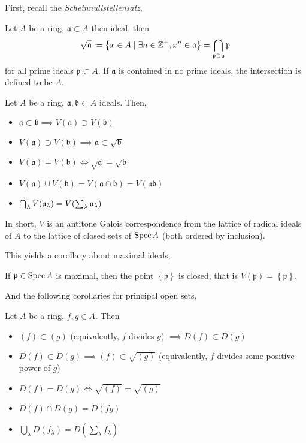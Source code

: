 \documentclass[000-main.tex]{subfiles}
\begin{document}
First, recall the \emph{Scheinnullstellensatz},
\begin{theorem}
  Let $A$ be a ring, $\mathfrak{a}\subset A$ then ideal, then
  \begin{displaymath}
    \sqrt{\mathfrak{a}} := \left\{ x\in A \mid \exists n\in\mathbb{Z}^+, x^n\in \mathfrak{a} \right\} = \bigcap_{\mathfrak{p}\supset\mathfrak{a}}\mathfrak{p}
  \end{displaymath}
  for all prime ideals $\mathfrak{p}\subset A$.
  If $\mathfrak{a}$ is contained in no prime ideals, the intersection is defined to be $A$.
\end{theorem}

\begin{lemma}
  Let $A$ be a ring, $\mathfrak{a}, \mathfrak{b}\subset A$ ideals.
  Then,
  \begin{itemize}
    \item $\mathfrak{a}\subset \mathfrak{b}\implies V(\mathfrak{a}) \supset V(\mathfrak{b})$
    \item $V(\mathfrak{a}) \supset V(\mathfrak{b}) \implies \mathfrak{a} \subset \sqrt{\mathfrak{b}}$
    \item $V(\mathfrak{a}) = V(\mathfrak{b}) \iff \sqrt{\mathfrak{a}} = \sqrt{\mathfrak{b}}$
    \item $V(\mathfrak{a}) \cup V(\mathfrak{b}) = V(\mathfrak{a} \cap \mathfrak{b}) = V(\mathfrak{a}\mathfrak{b})$
    \item $\bigcap_\lambda V(\mathfrak{a}_\lambda) = V\qty(\sum_\lambda \mathfrak{a}_\lambda)$
  \end{itemize}
  In short, $V$ is an antitone Galois correspondence from the lattice of radical ideals of $A$ to the lattice of closed sets of $\operatorname{Spec} A$ (both ordered by inclusion).
\end{lemma}
This yields a corollary about maximal ideals,
\begin{corollary}
  If $\mathfrak{p}\in\operatorname{Spec} A$ is maximal, then the point $\left\{ \mathfrak{p} \right\}$ is closed, that is $V(\mathfrak{p}) = \left\{ \mathfrak{p} \right\}$.
\end{corollary}

And the following corollaries for principal open sets,
\begin{corollary}
  Let $A$ be a ring, $f, g\in A$.
  Then
  \begin{itemize}
    \item $(f) \subset (g)$ (equivalently, $f$ divides $g$) $\implies D(f) \subset D(g)$
    \item $D(f) \subset D(g) \implies (f) \subset \sqrt{(g)}$ (equivalently, $f$ divides some positive power of $g$)
    \item $D(f) = D(g) \iff \sqrt{(f)} = \sqrt{(g)}$
    \item $D(f) \cap D(g) = D(fg)$
    \item $\bigcup_\lambda D(f_\lambda) = D(\sum_\lambda f_\lambda)$
  \end{itemize}
\end{corollary}
\end{document}
